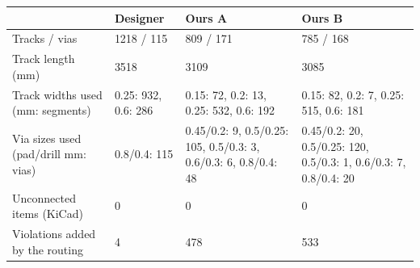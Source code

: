 \begin{tabular}{p{4.6cm}p{3.1cm}p{3.1cm}p{3.1cm}}
\toprule
 & Designer & Ours A & Ours B \\
\midrule
Tracks / vias & 1218 / 115 & 809 / 171 & 785 / 168 \\
Track length (mm) & 3518 & 3109 & 3085 \\
Track widths used (mm: segments) & 0.25: 932, 0.6: 286 & 0.15: 72, 0.2: 13, 0.25: 532, 0.6: 192 & 0.15: 82, 0.2: 7, 0.25: 515, 0.6: 181 \\
Via sizes used (pad/drill mm: vias) & 0.8/0.4: 115 & 0.45/0.2: 9, 0.5/0.25: 105, 0.5/0.3: 3, 0.6/0.3: 6, 0.8/0.4: 48 & 0.45/0.2: 20, 0.5/0.25: 120, 0.5/0.3: 1, 0.6/0.3: 7, 0.8/0.4: 20 \\
Unconnected items (KiCad) & 0 & 0 & 0 \\
Violations added by the routing & 4 & 478 & 533 \\
\bottomrule
\end{tabular}
